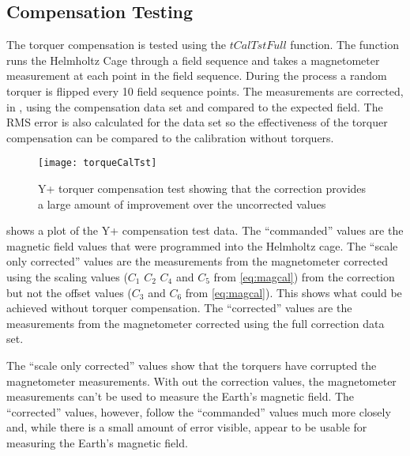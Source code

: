 \subsection{Compensation Testing}
\label{sec:tq-comp-tst}

The torquer compensation is tested using the \lstMat$tCalTstFull$ function. The function runs the Helmholtz Cage through a field sequence and takes a magnetometer measurement at each point in the field sequence. During the process a random torquer is flipped every 10 field sequence points. The measurements are corrected, in \matlab, using the compensation data set and compared to the expected field. The RMS error is also calculated for the data set so the effectiveness of the torquer compensation can be compared to the calibration without torquers.

\begin{figure}[!ht]
    \centering
    \texttt{[image: torqueCalTst]}
    \caption{Y+ torquer compensation test showing that the correction provides a large amount of improvement over the uncorrected values}
    \label{fig:tqtst}
\end{figure}

 shows a plot of the Y+ compensation test data. The \enquote{commanded} values are the magnetic field values that were programmed into the Helmholtz cage. The \enquote{scale only corrected} values are the measurements from the magnetometer corrected using the scaling values ($C_1$ $C_2$ $C_4$ and $C_5$ from \cref{eq:magcal}) from the correction but not the offset values ($C_3$ and $C_6$ from \cref{eq:magcal}). This shows what could be achieved without torquer compensation. The \enquote{corrected} values are the measurements from the magnetometer corrected using the full correction data set.

The \enquote{scale only corrected} values show that the torquers have corrupted the magnetometer measurements. With out the correction values, the magnetometer measurements can't be used to measure the Earth's magnetic field. The \enquote{corrected} values, however, follow the \enquote{commanded} values much more closely and, while there is a small amount of error visible, appear to be usable for measuring the Earth's magnetic field.


